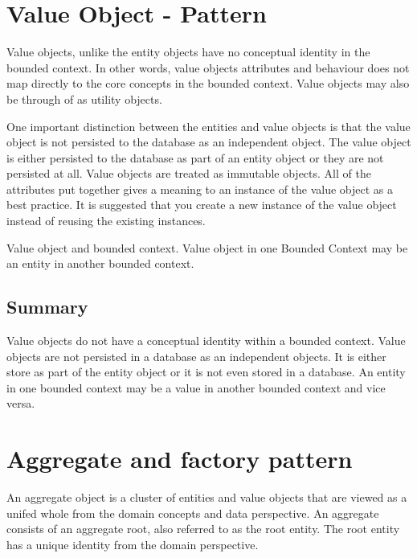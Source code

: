 \documentclass[a4paper, 11pt]{book}
\begin{document}
    \section{Value Object - Pattern}

    Value objects, unlike the entity objects have no conceptual identity in the bounded context.
    In other words, value objects attributes and behaviour does not map directly to the core concepts in the bounded context.
    Value objects may also be through of as utility objects. %

    One important distinction between the entities and value objects is that the value object is not persisted to the database as an independent object.
    The value object is either persisted to the database as part of an entity object or they are not persisted at all.
    Value objects are treated as immutable objects.
    All of the attributes put together gives a meaning to an instance of the value object as a best practice.
    It is suggested that you create a new instance of the value object instead of reusing the existing instances.

    Value object and bounded context.
    Value object in one Bounded Context may be an entity in another bounded context.

    \subsection{Summary}
    Value objects do not have a conceptual identity within a bounded context.
    Value objects are not persisted in a database as an independent objects.
    It is either store as part of the entity object or it is not even stored in a database.
    An entity in one bounded context may be a value in another bounded context and vice versa.


    \section{Aggregate and factory pattern}
    An aggregate object is a cluster of entities and value objects that are viewed as a unifed whole from the domain concepts and data perspective.
    An aggregate consists of an aggregate root, also referred to as the root entity.
    The root entity has a unique identity from the domain perspective.
\end{document}
